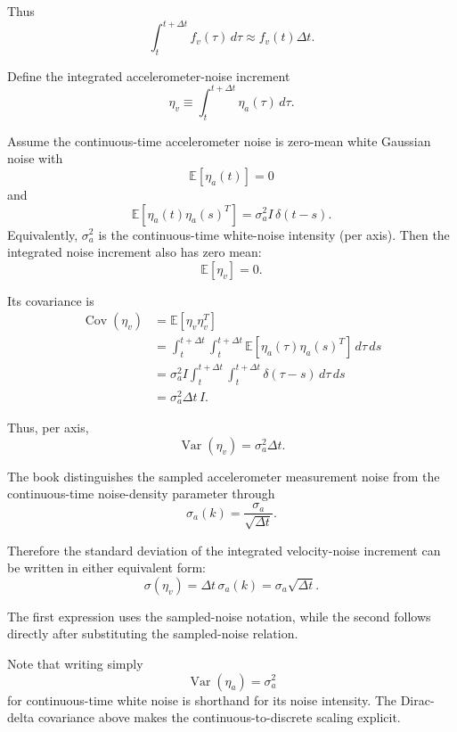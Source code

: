 \documentclass[11pt]{article}
\numberwithin{equation}{section}
\begin{document}
Thus
\[
\int_t^{t+\Delta t}f_v(\tau)\,d\tau
\approx
f_v(t)\Delta t.
\]

Define the integrated accelerometer-noise increment
\begin{equation}
\boxed{
\eta_v
\equiv
\int_t^{t+\Delta t}\eta_a(\tau)\,d\tau.
}
\end{equation}

Assume the continuous-time accelerometer noise is zero-mean white
Gaussian noise with
\[
\mathbb{E}[\eta_a(t)]=0
\]
and
\begin{equation}
\boxed{
\mathbb{E}\!\left[
\eta_a(t)\eta_a(s)^T
\right]
=
\sigma_a^2 I\,\delta(t-s).
}
\end{equation}
Equivalently, $\sigma_a^2$ is the continuous-time white-noise intensity
(per axis).  Then the integrated noise increment also has zero mean:
\[
\mathbb{E}[\eta_v]=0.
\]

Its covariance is
\begin{align}
\operatorname{Cov}(\eta_v)
&=
\mathbb{E}\!\left[
\eta_v\eta_v^T
\right]
\\
&=
\int_t^{t+\Delta t}
\int_t^{t+\Delta t}
\mathbb{E}\!\left[
\eta_a(\tau)\eta_a(s)^T
\right]
\,d\tau\,ds
\\
&=
\sigma_a^2 I
\int_t^{t+\Delta t}
\int_t^{t+\Delta t}
\delta(\tau-s)\,d\tau\,ds
\\
&=
\boxed{
\sigma_a^2\Delta t\,I.
}
\end{align}

Thus, per axis,
\begin{equation}
\boxed{
\operatorname{Var}(\eta_v)
=
\sigma_a^2\Delta t.
}
\end{equation}

The book distinguishes the sampled accelerometer measurement noise from
the continuous-time noise-density parameter through
\begin{equation}
\boxed{
\sigma_a(k)
=
\frac{\sigma_a}{\sqrt{\Delta t}}.
}
\end{equation}

Therefore the standard deviation of the integrated velocity-noise
increment can be written in either equivalent form:
\begin{equation}
\boxed{
\sigma(\eta_v)
=
\Delta t\,\sigma_a(k)
=
\sigma_a\sqrt{\Delta t}.
}
\end{equation}

The first expression uses the sampled-noise notation, while the
second follows directly after substituting the sampled-noise relation.

Note that writing simply
\[
\operatorname{Var}(\eta_a)=\sigma_a^2
\]
for continuous-time white noise is shorthand for its noise intensity.
The Dirac-delta covariance above makes the continuous-to-discrete
scaling explicit.
\end{document}
